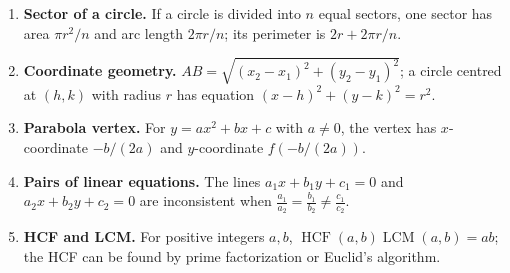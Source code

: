 \begin{enumerate}[label=\textbf{1.1.\arabic*.},ref=1.1.\arabic*]
\begin{equation*}
\end{equation*}
\item \label{formula-1-1-10} \textbf{Sector of a circle.} If a circle is divided into $n$ equal sectors, one sector has area $\pi r^2/n$ and arc length $2\pi r/n$; its perimeter is $2r+2\pi r/n$.
\item \label{formula-1-1-11} \textbf{Coordinate geometry.} $AB=\sqrt{(x_2-x_1)^2+(y_2-y_1)^2}$; a circle centred at $(h,k)$ with radius $r$ has equation $(x-h)^2+(y-k)^2=r^2$.
\item \label{formula-1-1-12} \textbf{Parabola vertex.} For $y=ax^2+bx+c$ with $a\ne0$, the vertex has $x$-coordinate $-b/(2a)$ and $y$-coordinate $f(-b/(2a))$.

\item \label{formula-1-1-13} \textbf{Pairs of linear equations.} The lines $a_1x+b_1y+c_1=0$ and $a_2x+b_2y+c_2=0$ are inconsistent when $\frac{a_1}{a_2}=\frac{b_1}{b_2}\ne\frac{c_1}{c_2}$.
\item \label{formula-1-1-14} \textbf{HCF and LCM.} For positive integers $a,b$, $\operatorname{HCF}(a,b)\operatorname{LCM}(a,b)=ab$; the HCF can be found by prime factorization or Euclid's algorithm.
\end{enumerate}
